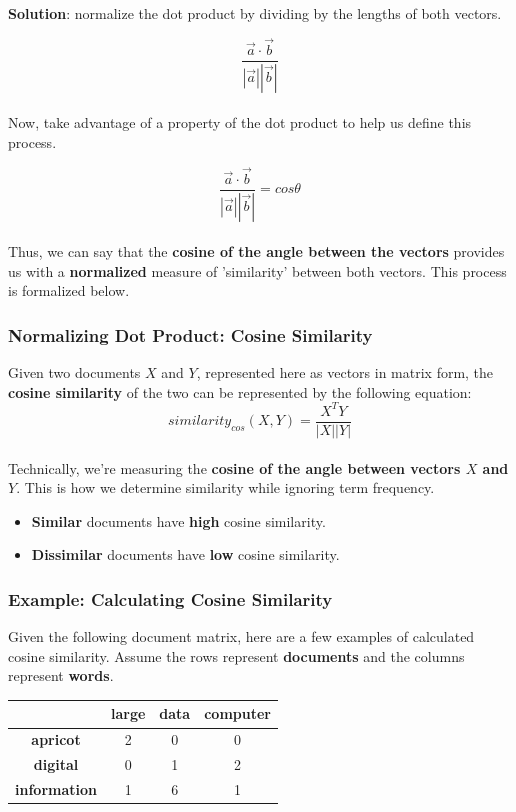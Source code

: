 \documentclass[english, 10pt]{article}
\begin{document}
\textbf{Solution}: normalize the dot product by dividing by the lengths of both vectors.

$$\frac{\vec{a} \cdot \vec{b}}{|\vec{a}||\vec{b}|}$$\\

Now, take advantage of a property of the dot product to help us define this process.

$$\frac{\vec{a} \cdot \vec{b}}{|\vec{a}||\vec{b}|} = cos \theta$$\\

Thus, we can say that the \textbf{cosine of the angle between the vectors} provides us with a \textbf{normalized} measure of 'similarity' between both vectors. This process is formalized below.

\subsubsection{Normalizing Dot Product: Cosine Similarity}

Given two documents $X$ and $Y$, represented here as vectors in matrix form, the \textbf{cosine similarity} of the two can be represented by the following equation:\\

$$similarity_{cos}(X,Y)=\frac{X^TY}{|X||Y|}$$\\

Technically, we're measuring the \textbf{cosine of the angle between vectors $X$ and $Y$}. This is how we determine similarity while ignoring term frequency.\\

\begin{itemize}
	\item \textbf{Similar} documents have \textbf{high} cosine similarity.
	\item \textbf{Dissimilar} documents have \textbf{low} cosine similarity.
\end{itemize}

\subsubsection{Example: Calculating Cosine Similarity}

Given the following document matrix, here are a few examples of calculated cosine similarity. Assume the rows represent \textbf{documents} and the columns represent \textbf{words}.\\

\begin{center}
\begin{tabular}{ |c|c c c| } 
 \hline
  & \textbf{large} & \textbf{data} & \textbf{computer} \\
  \hline 
 \textbf{apricot} & 2 & 0 & 0 \\ 
 \textbf{digital} & 0 & 1 & 2 \\ 
 \textbf{information} & 1 & 6 & 1 \\ 
 \hline
\end{tabular}
\end{center}
\end{document}
